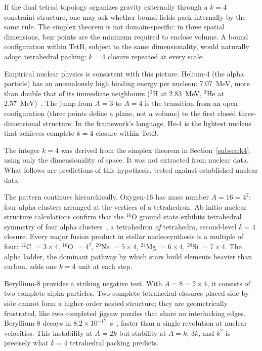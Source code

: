 \documentclass[aps,prd,preprint,superscriptaddress,showpacs,preprintnumbers,amsmath,amssymb,nofootinbib]{revtex4-2}
\begin{document}
If the dual tetrad topology organizes gravity externally through a $k = 4$ constraint structure, one may ask whether bound fields pack internally by the same rule. The simplex theorem is not domain-specific: in three spatial dimensions, four points are the minimum required to enclose volume. A bound configuration within TetB, subject to the same dimensionality, would naturally adopt tetrahedral packing: $k = 4$ closure repeated at every scale.

Empirical nuclear physics is consistent with this picture. Helium-4 (the alpha particle) has an anomalously high binding energy per nucleon: 7.07~MeV, more than double that of its immediate neighbours ($^3$H at 2.83~MeV, $^3$He at 2.57~MeV)~\cite{audi2003}. The jump from $A = 3$ to $A = 4$ is the transition from an open configuration (three points define a plane, not a volume) to the first closed three-dimensional structure. In the framework's language, He-4 is the lightest nucleus that achieves complete $k = 4$ closure within TetB.

The integer $k = 4$ was derived from the simplex theorem in Section~\ref{subsec:k4}, using only the dimensionality of space. It was not extracted from nuclear data. What follows are predictions of this hypothesis, tested against established nuclear data.

The pattern continues hierarchically. Oxygen-16 has mass number $A = 16 = 4^2$: four alpha clusters arranged at the vertices of a tetrahedron. Ab initio nuclear structure calculations confirm that the $^{16}$O ground state exhibits tetrahedral symmetry of four alpha clusters~\cite{epelbaum2012}, a tetrahedron \emph{of} tetrahedra, second-level $k = 4$ closure. Every major fusion product in stellar nucleosynthesis is a multiple of four: $^{12}$C $= 3 \times 4$, $^{16}$O $= 4^2$, $^{20}$Ne $= 5 \times 4$, $^{24}$Mg $= 6 \times 4$, $^{28}$Si $= 7 \times 4$. The alpha ladder, the dominant pathway by which stars build elements heavier than carbon, adds one $k = 4$ unit at each step.

Beryllium-8 provides a striking negative test. With $A = 8 = 2 \times 4$, it consists of two complete alpha particles. Two complete tetrahedral closures placed side by side cannot form a higher-order nested structure; they are geometrically frustrated, like two completed jigsaw puzzles that share no interlocking edges. Beryllium-8 decays in $8.2 \times 10^{-17}$~s~\cite{tilley2004}, faster than a single revolution at nuclear velocities. This instability at $A = 2k$ but stability at $A = k$, $3k$, and $k^2$ is precisely what $k = 4$ tetrahedral packing predicts.
\end{document}
